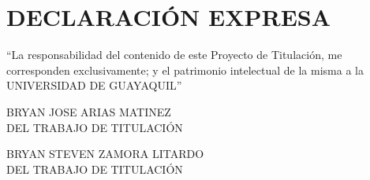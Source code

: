 \documentclass[12pt, a4paper, nofontenc, numbers=endperiod]{apa7}
\begin{document}
	{ %
		
		\section*{\large \centering DECLARACIÓN EXPRESA}	
		
		\vspace*{5cm}
		\begin{flushright}
			\begin{minipage}[b]{10cm}		
				“La responsabilidad del contenido de este Proyecto de Titulación, me corresponden exclusivamente; y el patrimonio intelectual de la misma a la UNIVERSIDAD DE GUAYAQUIL” 
			\end{minipage}	
		\end{flushright}
		\vspace*{3cm}
		
		
		\begin{flushright}
			\begin{minipage}[b]{10cm}
				\centering\singlespacing		
				BRYAN JOSE ARIAS MATINEZ \\ DEL TRABAJO DE TITULACIÓN		
			\end{minipage}	
		\end{flushright}
		\vspace*{1cm}
		
		\begin{flushright}
			\begin{minipage}[b]{10cm}
				\centering\singlespacing		
				{\color{red}BRYAN STEVEN ZAMORA LITARDO \\ DEL TRABAJO DE TITULACIÓN}		
			\end{minipage}	
		\end{flushright}
	}
	\newpage
\end{document}
